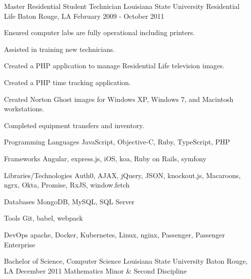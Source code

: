 \documentclass[letterpaper]{awesome-cv}
\begin{document}
\begin{cventries}
  \cventry
    {Master Residential Student Technician}
    {Louisiana State University Residential Life}
    {Baton Rouge, LA}
    {February 2009 - October 2011}
    {\begin{cvitems}
      \item {Ensured computer labs are fully operational including printers.}
      \item {Assisted in training new technicians.}
      \item {Created a PHP application to manage Residential Life television images.}
      \item {Created a PHP time tracking application.}
      \item {Created Norton Ghost images for Windows XP, Windows 7, and Macintosh workstations.}
      \item {Completed equipment transfers and inventory.}
      \end{cvitems}}
\end{cventries}

\pagebreak

\begin{cvskills}
  \cvskill
    {Programming Languages}
    {JavaScript, Objective-C, Ruby, TypeScript, PHP}

  \cvskill
    {Frameworks}
    {Angular, express.js, iOS, koa, Ruby on Rails, symfony}

  \cvskill
    {Libraries/Technologies}
    {Auth0, AJAX, jQuery, JSON, knockout.js, Macaroons, ngrx, Okta, Promise, RxJS, window.fetch}

  \cvskill
    {Databases}
    {MongoDB, MySQL, SQL Server}

  \cvskill
    {Tools}
    {Git, babel, webpack}

  \cvskill
    {DevOps}
    {apache, Docker, Kubernetes, Linux, nginx, Passenger, Passenger Enterprise}
\end{cvskills}

\begin{cventries}
  \cventry
    {Bachelor of Science, Computer Science}
    {Louisiana State University}
    {Baton Rouge, LA}
    {December 2011}
    {Mathematics Minor \& Second Discipline}
\end{cventries}
\end{document}
